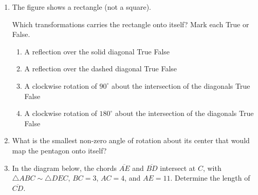 \documentclass[12pt, twoside]{article}
\begin{document}
\begin{enumerate}
\newpage
 \item The figure shows a rectangle (not a square).
   \begin{center}
   \end{center}
   Which transformations carries the rectangle onto itself? Mark each True or False.
     \begin{enumerate}
       \item A reflection over the solid diagonal \hfill True \quad False
       \item A reflection over the dashed diagonal \hfill True \quad False
       \item A clockwise rotation of $90^\circ$ about the intersection of the diagonals \hfill True \quad False
       \item A clockwise rotation of $180^\circ$ about the intersection of the diagonals \hfill True \quad False
     \end{enumerate}
     \vspace{1cm}

   \item What is the smallest non-zero angle of rotation about its center that would map the pentagon onto itself? \vspace{0.25cm} %
   \begin{center}
     \end{center} \vspace{0.5cm}

  \item In the diagram below, the chords $\overline{AE}$ and $\overline{BD}$ intersect at $C$, with $\triangle ABC \sim \triangle DEC$, $BC=3$, $AC=4$, and $AE=11$. Determine the length of $\overline{CD}$.
      \begin{center}
    \end{center}



\end{enumerate}
\end{document}
